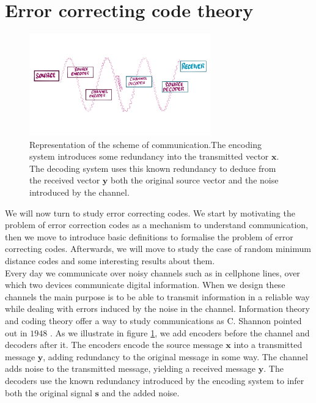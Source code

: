 \section{Error correcting code theory}
\begin{figure}[H]
\centering
\includegraphics[width=0.7\textwidth]{Figures/Source_Destination.png}
\caption{Representation of the scheme of communication.The encoding system introduces some redundancy into the transmitted vector $\mathbf{x}$. The decoding system uses this known redundancy to deduce from the received vector $\mathbf{y}$ both the original source vector and the noise introduced by the channel.}
\label{CH2:Channel_communication}
\end{figure}
We will now turn to study error correcting codes. We start by motivating the problem of error correction codes as a mechanism to understand communication, then we move to introduce basic definitions to formalise the problem of error correcting codes. Afterwards, we will move to study the case of random minimum distance codes and some interesting results about them.\\
\indent Every day we communicate over noisy channels such as in cellphone lines, over which two devices communicate digital information. When we design these channels the main purpose is to be able to transmit information in a reliable way while dealing with  errors induced by the noise in the channel. Information theory and coding theory offer a way to study communications as C. Shannon pointed out in $1948$ \cite{shannon_mathematical_1948}. As we illustrate in figure \ref{CH2:Channel_communication}, we add encoders before the channel and decoders after it. The encoders encode the source message $\mathbf{x}$ into a transmitted message $\mathbf{y}$, adding redundancy to the original message in some way. The channel adds noise to the transmitted message, yielding a received message $\mathbf{y}$. The decoders use the known redundancy introduced by the encoding system to infer both the original signal $\mathbf{s}$ and the added noise.
